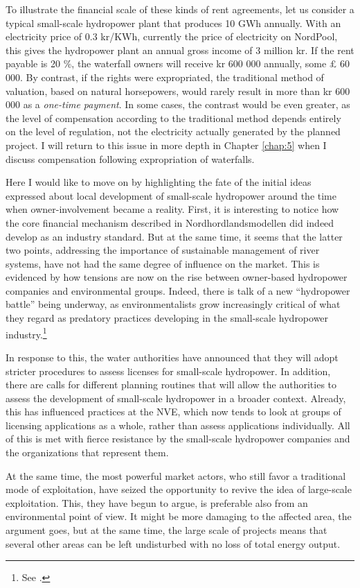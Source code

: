 To illustrate the financial scale of these kinds of rent agreements, let us consider a typical small-scale hydropower plant that produces 10 GWh annually. With an electricity price of 0.3 kr/KWh, currently the price of electricity on NordPool, this gives the hydropower plant an annual gross income of 3 million kr. If the rent payable is 20 \%, the waterfall owners will receive kr 600 000 annually, some £ 60 000. By contrast, if the rights were expropriated, the traditional method of valuation, based on natural horsepowers, would rarely result in more than kr 600 000 as a {\it one-time payment}. In some cases, the contrast would be even greater, as the level of compensation according to the traditional method depends entirely on the level of regulation, not the electricity actually generated by the planned project. I will return to this issue in more depth in Chapter \ref{chap:5} when I discuss compensation following expropriation of waterfalls.

Here I would like to move on by highlighting the fate of the initial ideas expressed about local development of small-scale hydropower around the time when owner-involvement became a reality. First, it is interesting to notice how the core financial mechanism described in Nordhordlandsmodellen did indeed develop as an industry standard. But at the same time, it seems that the latter two points, addressing the importance of sustainable management of river systems, have not had the same degree of influence on the market. This is evidenced by how tensions are now on the rise between owner-based hydropower companies and environmental groups. Indeed, there is talk of a new ``hydropower battle'' being underway, as environmentalists grow increasingly critical of what they regard as predatory practices developing in the small-scale hydropower industry.\footnote{See \cite{haltbrekken12}.}

In response to this, the water authorities have announced that they will adopt stricter procedures to assess licenses for small-scale hydropower. In addition, there are calls for different planning routines that will allow the authorities to assess the development of small-scale hydropower in a broader context. Already, this has influenced practices at the NVE, which now tends to look at groups of licensing applications as a whole, rather than assess applications individually. All of this is met with fierce resistance by the small-scale hydropower companies and the organizations that represent them. 

At the same time, the most powerful market actors, who still favor a traditional mode of exploitation, have seized the opportunity to revive the idea of large-scale exploitation. This, they have begun to argue, is preferable also from an environmental point of view. It might be more damaging to the affected area, the argument goes, but at the same time, the large scale of projects means that several other areas can be left undisturbed with no loss of total energy output.

